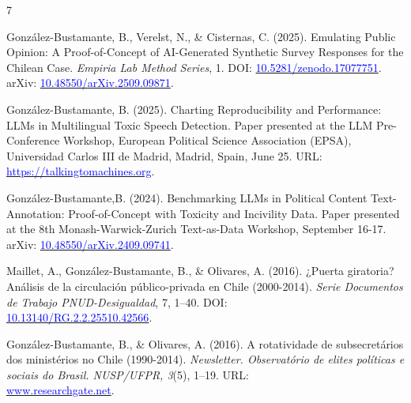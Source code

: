 \begin{publications}

\begin{benumerate}{7}

\item{González-Bustamante, B., Verelst, N., \& Cisternas, C. (2025). Emulating Public Opinion: A Proof-of-Concept of AI-Generated Synthetic Survey Responses for the Chilean Case. {\itshape Empiria Lab Method Series}, 1. DOI: \href{https://doi.org/10.5281/zenodo.17077751}{\textcolor{blue}{10.5281/zenodo.17077751}}. arXiv: \href{https://doi.org/10.48550/arXiv.2509.09871}{\textcolor{blue}{10.48550/arXiv.2509.09871}}.}\vspace{1mm}

\item{González-Bustamante, B. (2025). Charting Reproducibility and Performance: LLMs in Multilingual Toxic Speech Detection. Paper presented at the LLM Pre-Conference Workshop, European Political Science Association (EPSA), Universidad Carlos III de Madrid, Madrid, Spain, June 25. URL: \href{https://talkingtomachines.org/large-language-models-workshop/}{\textcolor{blue}{https://talkingtomachines.org}}.}\vspace{1mm}

\item{González-Bustamante,B. (2024). Benchmarking LLMs in Political Content Text-Annotation: Proof-of-Concept with Toxicity and Incivility Data. Paper presented at the 8th Monash-Warwick-Zurich Text-as-Data Workshop, September 16-17. arXiv: \href{https://doi.org/10.48550/arXiv.2409.09741}{\textcolor{blue}{10.48550/arXiv.2409.09741}}.}\vspace{1mm}

\item{Maillet, A., González-Bustamante, B., \& Olivares, A. (2016). ¿Puerta giratoria? Análisis de la circulación público-privada en Chile (2000-2014). {\itshape Serie Documentos de Trabajo PNUD-Desigualdad}, 7, 1--40. DOI: \\ \href{http://doi.org/10.13140/RG.2.2.25510.42566}{\textcolor{blue}{10.13140/RG.2.2.25510.42566}}.}\vspace{1mm}

\item{González-Bustamante, B., \& Olivares, A. (2016). A rotatividade de subsecretários dos ministérios no Chile (1990-2014). {\itshape Newsletter. Observat\'orio de elites pol\'iticas e sociais do Brasil. NUSP/UFPR, 3}(5), 1--19. URL: \\ \href{https://www.researchgate.net/publication/321993740_A_rotatividade_de_subsecretarios_dos_ministerios_no_Chile_1990-2014}{\textcolor{blue}{www.researchgate.net}}.}\vspace{1mm}


\end{benumerate}
\end{publications}

